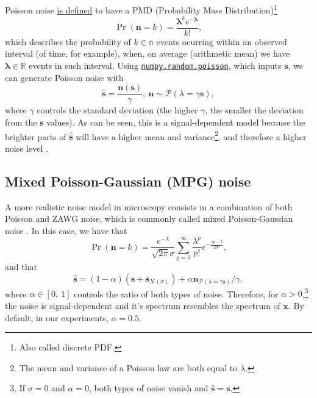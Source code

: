 \documentclass{article}
\begin{document}
Poisson noise
\href{https://en.wikipedia.org/wiki/Poisson_distribution}{is defined}
to have a PMD (Probability Mass Distribution)\footnote{Also called
  discrete PDF.}
\begin{equation}
  \Pr({\mathbf n}{=}k) = \frac{\mathbf{\lambda}^ke^{-\mathbf{\lambda}}}{k!},
  \label{eq:PN}
\end{equation}
which describes the probability of $k\in\mathbb{n}$ events ocurring
within an observed interval (of time, for example), when, on average
(arithmetic mean) we have ${\mathbf \lambda}\in\mathbb{R}$ events in
such interval. Using
\href{https://numpy.org/doc/stable/reference/random/generated/numpy.random.poisson.html#numpy-random-poisson}{\texttt{numpy.random.poisson}},
which inputs $\mathbf{s}$, we can generate Poisson noise with
\begin{equation}
  \hat{\mathbf{s}} = \frac{\mathbf{n}(\mathbf{s})}{\gamma},~\mathbf{n}\sim\mathcal{P}(\lambda=\gamma\mathbf{s}),
\end{equation}
where $\gamma$ controls the standard deviation (the higher $\gamma$,
the smaller the deviation from the $\mathbf{s}$ values). As can be
seen, this is a signal-dependent model because the brighter parts of
$\hat{\mathbf s}$ will have a higher mean and variance\footnote{The
  mean and variance of a Poisson law are both equal to $\lambda$.},
and therefore a higher noise level \cite{meiniel2018denoising}.


\subsection{Mixed Poisson-Gaussian (MPG) noise}

A more realistic noise model in microscopy consists in a combination
of both Poisson and ZAWG noise, which is commonly called mixed
Poisson-Gaussian noise \cite{meiniel2018denoising}. In this
case, we have that
\begin{equation}
  \Pr({\mathbf n}{=}k) = \frac{e^{-\lambda}}{\sqrt{2\pi}\sigma}\sum_{p=0}^{\infty}\frac{\lambda^p}{p!} e^{-\frac{\gamma p - k}{2\sigma^2}},
  \label{eq:PN}
\end{equation}
and that
\begin{equation}
  \hat{\mathbf s} = (1-\alpha)(\mathbf{s} + {\mathbf s}_{\mathcal{N}(\sigma)}) + \alpha{\mathbf n}_{\mathcal{P}(\lambda=\gamma\mathbf{s})}/\gamma,
  \label{eq:MPG_noise_model} 
\end{equation}
where $\alpha\in[0,~1]$ controls the ratio of both types of
noise. Therefore, for $\alpha > 0$,\footnote{If $\sigma=0$ and
  $\alpha=0$, both types of noise vanish and
  $\hat{\mathbf{s}}=\mathbf{s}$.} the noise is signal-dependent and
it's spectrum resembles the spectrum of $\mathbf{x}$. By default, in
our experiments, $\alpha=0.5$.
\end{document}
